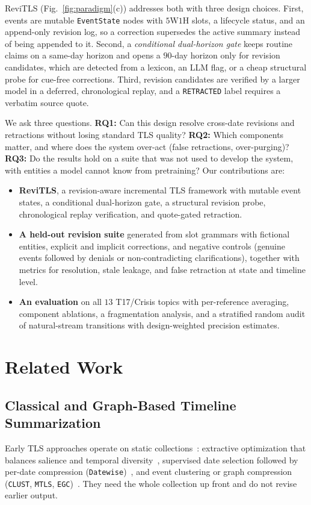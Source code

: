 \documentclass[journal]{IEEEtran}
\begin{document}
ReviTLS (Fig.~\ref{fig:paradigm}(c)) addresses both with three design choices. First, events are mutable \texttt{EventState} nodes with $5\text{W}1\text{H}$ slots, a lifecycle status, and an append-only revision log, so a correction supersedes the active summary instead of being appended to it. Second, a \textit{conditional dual-horizon gate} keeps routine claims on a same-day horizon and opens a $90$-day horizon only for revision candidates, which are detected from a lexicon, an LLM flag, or a cheap structural probe for cue-free corrections. Third, revision candidates are verified by a larger model in a deferred, chronological replay, and a \texttt{RETRACTED} label requires a verbatim source quote.

We ask three questions. \textbf{RQ1:} Can this design resolve cross-date revisions and retractions without losing standard TLS quality? \textbf{RQ2:} Which components matter, and where does the system over-act (false retractions, over-purging)? \textbf{RQ3:} Do the results hold on a suite that was not used to develop the system, with entities a model cannot know from pretraining? Our contributions are:
\begin{itemize}
    \item \textbf{ReviTLS}, a revision-aware incremental TLS framework with mutable event states, a conditional dual-horizon gate, a structural revision probe, chronological replay verification, and quote-gated retraction.
    \item \textbf{A held-out revision suite} generated from slot grammars with fictional entities, explicit and implicit corrections, and negative controls (genuine events followed by denials or non-contradicting clarifications), together with metrics for resolution, stale leakage, and false retraction at state and timeline level.
    \item \textbf{An evaluation} on all $13$ T17/Crisis topics with per-reference averaging, component ablations, a fragmentation analysis, and a stratified random audit of natural-stream transitions with design-weighted precision estimates.
\end{itemize}

\section{Related Work}
\label{sec:related}

\subsection{Classical and Graph-Based Timeline Summarization}
Early TLS approaches operate on static collections~\cite{tran2013leveraging, tran2015timeline, martschat2017improving, ghalandari2020examining}: extractive optimization that balances salience and temporal diversity~\cite{martschat2018temporally}, supervised date selection followed by per-date compression (\texttt{Datewise})~\cite{ghalandari2020examining, steen2019abstractive}, and event clustering or graph compression (\texttt{CLUST}, \texttt{MTLS}, \texttt{EGC})~\cite{ghalandari2020examining, yu2021multi, li2021timeline}. They need the whole collection up front and do not revise earlier output.
\end{document}
